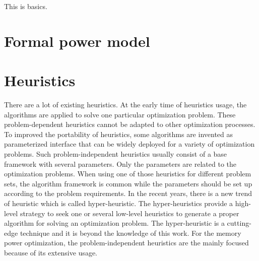 \label{chap:basics}
This is basics.
	\section{Formal power model}
	\label{sec:power_model}
	
	\section{Heuristics}
	\label{sec:heuristics}
	There are a lot of existing heuristics. At the early time of heuristics usage, the algorithms are applied to solve one
	particular optimization problem. These problem-dependent heuristics cannot be adapted to other optimization processes.
	To improved the portability of heuristics, some algorithms are invented as parameterized interface that can be widely
	deployed for a variety of optimization problems. Such problem-independent heuristics usually consist of a base framework
	with several parameters. Only the parameters are related to the optimization problems. When using one of those
	heuristics for different problem sets, the algorithm framework is common while the parameters should be set up according
	to the problem requirements. In the recent years, there is a new trend of heuristic which is called hyper-heuristic.
	The hyper-heuristics provide a high-level strategy to seek one or several low-level heuristics to generate a proper algorithm for solving an optimization problem. The hyper-heuristic is a cutting-edge technique and it is beyond the knowledge of this work. For the memory power optimization, the problem-independent heuristics are the mainly focused
	because of its extensive usage.
	
